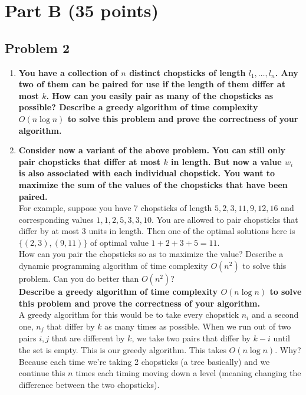 \documentclass[11pt]{article}
\begin{document}
\section*{Part B (35 points)}

\subsection*{Problem 2}

\begin{enumerate}[label=\Alph*.]

\item \textbf{You have a collection of $n$ distinct chopsticks of
length $l_{1},\dots,l_{n}$. Any two of them can be paired for use if
the length of them differ at most $k$. How can you easily pair as many
of the chopsticks as possible? Describe a greedy algorithm of time
complexity $O(n\log n)$ to solve this problem and prove the
correctness of your algorithm.}\\

\item \textbf{Consider now a variant of the above problem. You
can still only pair chopsticks that differ at most $k$ in length. But
now a value $w_{i}$ is also associated with each individual
chopstick. You want to maximize the sum of the values of the
chopsticks that have been paired.}\\

\noindent For example, suppose you have 7 chopsticks of length
$5,2,3,11,9,12,16$ and corresponding values $1,1,2,5,3,3,10$. You are
allowed to pair chopsticks that differ by at most 3 units in
length. Then one of the optimal solutions here is $\{ (2,3),(9,11) \}$
of optimal value $1+2+3+5=11$.\\

\noindent How can you pair the chopsticks so as to maximize the value?
Describe a dynamic programming algorithm of time complexity $O(n^{2})$
to solve this problem. Can you do better than $O(n^{2})$?\\

\noindent \textbf{Describe a greedy algorithm of time
complexity $O(n\log n)$ to solve this problem and prove the
correctness of your algorithm.}\\

A greedy algorithm for this would be to take every chopstick $n_i$ and a second one, $n_j$ that differ by $k$ as many times as possible. When we run out of two pairs $i,j$ that are different by $k$, we take two pairs that differ by $k-i$ until the set is empty. This is our greedy algorithm. This takes $O(n\log n)$. Why? Because each time we're taking 2 chopsticks (a tree basically) and we continue this $n$ times each timing moving down a level (meaning changing the difference between the two chopsticks).


\end{enumerate}
\end{document}
